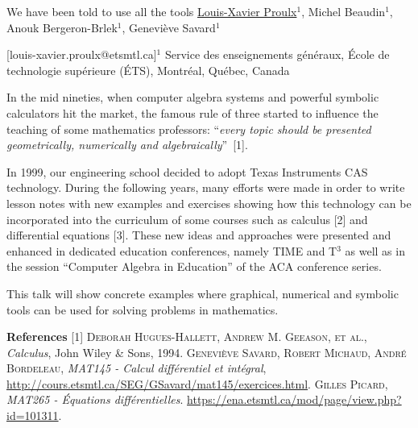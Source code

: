 


\begin{abstract_online}{We have been told to use all the tools}{%
        \underline{Louis-Xavier Proulx}$^{1}$, Michel Beaudin$^{1}$, Anouk Bergeron-Brlek$^{1}$, Genevi\`eve Savard$^{1}$}
    
    {[louis-xavier.proulx@etsmtl.ca]}{$^1$  Service des enseignements g\'en\'eraux, \'Ecole de technologie sup\'erieure (\'ETS), Montr\'eal, Qu\'ebec, Canada}
    
In the mid nineties, when computer algebra systems and powerful symbolic calculators hit the market, the famous rule of three started to influence the teaching of some mathematics professors: ``\emph{every topic should be presented geometrically, numerically and algebraically}''~[1].  

In 1999, our engineering school decided to adopt Texas Instruments CAS technology.  During the following years,  many efforts were made in order to write lesson notes with new examples and exercises showing how this technology can be incorporated into the curriculum of some courses such as calculus [2] and differential equations [3]. These new ideas and approaches were presented and enhanced in dedicated education conferences, namely TIME and T$^{3}$ as well as in the session ``Computer Algebra in Education'' of the ACA conference series.

This talk will show concrete examples where graphical, numerical and symbolic tools can be used for solving problems in mathematics.

\textbf{References} \newline{}
[1] \textsc{Deborah Hugues-Hallett, Andrew M. Geeason, et al.}, \emph{Calculus},  John Wiley \& Sons, 1994. \newline
[2] \textsc{Geneviève Savard, Robert Michaud, Andr\'e Bordeleau}, \emph{MAT145 - Calcul diff\'erentiel et int\'egral},  \small{\url{http://cours.etsmtl.ca/SEG/GSavard/mat145/exercices.html}}. \newline
[3] \textsc{Gilles Picard}, \emph{MAT265 - \'Equations diff\'erentielles}.  \small{\url{https://ena.etsmtl.ca/mod/page/view.php?id=101311}}. \newline

\end{abstract_online}
    